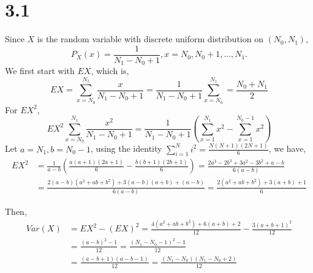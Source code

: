 \documentclass[letterpaper]{article}
\begin{document}
    \section*{3.1}
    Since $X$ is the random variable with discrete uniform distribution on $(N_0, N_1)$, 
    \[
    P_X(x) = \frac{1}{N_1-N_0+1}, x = N_0, N_0 + 1, \dots, N_1.
    \]
    We first start with $EX$, which is,
    \[
    EX = \sum_{x=N_0}^{N_1} \frac{x}{N_1 - N_0 + 1} = \frac{1}{N_1 - N_0 + 1} \sum_{x=N_0}^{N_1} = \frac{N_0 + N_1}{2}
    \]
    For $EX^2$, 
    \[
    EX^2 \sum_{x=N_0}^{N_1} \frac{x^2}{N_1 - N_0 + 1} = \frac{1}{N_1-N_0+1} \left(\sum_{x=1}^{N_1} x^2 - \sum_{x=1}^{N_0-1} x^2 \right)
    \]
    Let $a = N_1, b = N_0 - 1$, using the identity 
    $ \sum_{i=1}^{N} i^2 = \frac{N(N+1)(2N+1)}{6}$,
    we have,
    \begin{align*}
    EX^2 & = \frac{1}{a-b} \left(\frac{a(a+1)(2a+1)}{6} - \frac{b(b+1)(2b+1)}{6}\right) = \frac{2a^3 - 2b^3 + 3a^2 - 3b^2 + a-b}{6(a-b)} \\
    & = \frac{2(a-b)(a^2 + ab + b^2) + 3(a-b)(a+b) + (a-b)}{6(a-b)} 
    = \frac{2(a^2 + ab+ b^2) + 3(a+b) + 1}{6}
    \end{align*}

    Then,
    \begin{align*}
    Var(X) & = EX^2 - (EX)^2 = \frac{4(a^2+ab+b^2) + 6(a+b) +2}{12} - \frac{3(a+b+1)^2}{12}\\
    & = \frac{(a-b)^2 -1}{12} = \frac{(N_1-N_0-1)^2-1}{12} \\
    & =\frac{(a-b+1)(a-b-1)}{12} = \frac{(N_1-N_0)(N_1-N_0+2)}{12}
    \end{align*}
\end{document}

